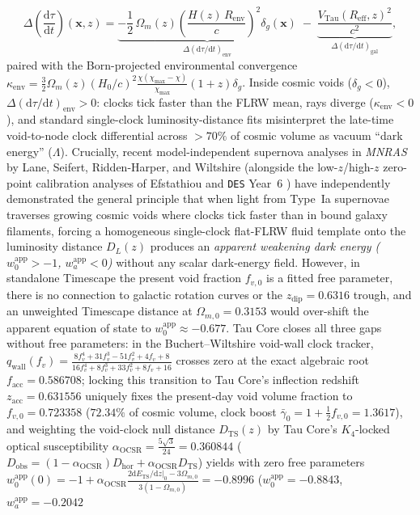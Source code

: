 \documentclass[11pt,a4paper]{article}
\begin{document}
\begin{enumerate}
  \begin{equation}
    \Delta\!\left(\frac{\mathrm{d}\tau}{\mathrm{d}t}\right)(\mathbf{x}, z) = \underbrace{-\frac{1}{2}\,\Omega_m(z)\!\left(\frac{H(z)\,R_{\mathrm{env}}}{c}\right)^{\!2}\delta_g(\mathbf{x})}_{\Delta(\mathrm{d}\tau/\mathrm{d}t)_{\mathrm{env}}} \;-\; \underbrace{\frac{V_{\mathrm{Tau}}(R_{\mathrm{eff}}, z)^2}{c^2}}_{\Delta(\mathrm{d}\tau/\mathrm{d}t)_{\mathrm{gal}}}, \label{eq:clock_shift}
  \end{equation}
  paired with the Born-projected environmental convergence $\kappa_{\mathrm{env}} = \frac{3}{2}\Omega_m(z)(H_0/c)^2 \frac{\chi(\chi_{\max}-\chi)}{\chi_{\max}}(1+z)\delta_g$. Inside cosmic voids ($\delta_g < 0$), $\Delta(\mathrm{d}\tau/\mathrm{d}t)_{\mathrm{env}} > 0$: clocks tick faster than the FLRW mean, rays diverge ($\kappa_{\mathrm{env}} < 0$), and standard single-clock luminosity-distance fits misinterpret the late-time void-to-node clock differential across $>70\%$ of cosmic volume as vacuum ``dark energy'' ($\Lambda$). Crucially, recent model-independent supernova analyses in \textit{MNRAS} by Lane, Seifert, Ridden-Harper, and Wiltshire \cite{LaneWiltshire2025MNRAS,SeifertWiltshire2025MNRAS} (alongside the low-$z$/high-$z$ zero-point calibration analyses of Efstathiou \cite{Efstathiou2025SN} and \texttt{DES} Year~6 \cite{DES2026DynDE}) have independently demonstrated the general principle that when light from Type~Ia supernovae traverses growing cosmic voids where clocks tick faster than in bound galaxy filaments, forcing a homogeneous single-clock flat-FLRW fluid template onto the luminosity distance $D_L(z)$ produces an \emph{apparent weakening dark energy ($w_0^{\mathrm{app}} > -1$, $w_a^{\mathrm{app}} < 0$)} without any scalar dark-energy field. However, in standalone Timescape \cite{LaneWiltshire2025MNRAS,SeifertWiltshire2025MNRAS} the present void fraction $f_{v,0}$ is a fitted free parameter, there is no connection to galactic rotation curves or the $z_{\mathrm{dip}} = 0.6316$ trough, and an unweighted Timescape distance at $\Omega_{m,0} = 0.3153$ would over-shift the apparent equation of state to $w_0^{\mathrm{app}} \approx -0.677$. Tau Core closes all three gaps without free parameters: in the Buchert--Wiltshire void-wall clock tracker, $q_{\mathrm{wall}}(f_v) = \frac{8f_v^4+31f_v^3-51f_v^2+4f_v+8}{16f_v^4+8f_v^3+33f_v^2+8f_v+16}$ crosses zero at the exact algebraic root $f_{\mathrm{acc}} = 0.586708$; locking this transition to Tau Core's inflection redshift $z_{\mathrm{acc}} = 0.631556$ uniquely fixes the present-day void volume fraction to $f_{v,0} = \mathbf{0.723358}$ ($72.34\%$ of cosmic volume, clock boost $\bar{\gamma}_0 = 1 + \frac{1}{2}f_{v,0} = 1.3617$), and weighting the void-clock null distance $D_{\mathrm{TS}}(z)$ by Tau Core's $K_4$-locked optical susceptibility $\alpha_{\mathrm{OCSR}} = \frac{5\sqrt{3}}{24} = 0.360844$ ($D_{\mathrm{obs}} = (1-\alpha_{\mathrm{OCSR}})D_{\mathrm{hor}} + \alpha_{\mathrm{OCSR}}D_{\mathrm{TS}}$) yields with zero free parameters $w_0^{\mathrm{app}}(0) = -1 + \alpha_{\mathrm{OCSR}}\frac{2\mathrm{d}E_{\mathrm{TS}}/\mathrm{d}z|_0 - 3\Omega_{m,0}}{3(1-\Omega_{m,0})} = \mathbf{-0.8996}$ ($w_0^{\mathrm{app}} = \mathbf{-0.8843}$, $w_a^{\mathrm{app}} = -0.2042$ 
\end{enumerate}
\end{document}
